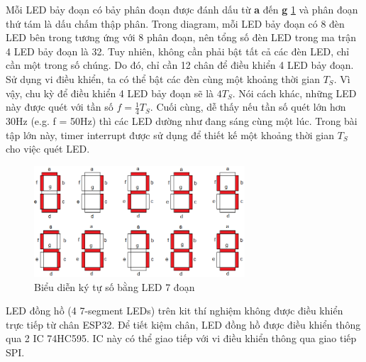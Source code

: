 Mỗi LED bảy đoạn có bảy phân đoạn được đánh dấu từ \textbf{a} đến \textbf{g} \ref{digit} và phân đoạn thứ tám là dấu chấm thập phân. Trong diagram, mỗi LED bảy đoạn có 8 đèn LED bên trong tương ứng với 8 phân đoạn, nên tổng số đèn LED trong ma trận 4 LED bảy đoạn là 32. Tuy nhiên, không cần phải bật tất cả các đèn LED, chỉ cần một trong số chúng. Do đó, chỉ cần 12 chân để điều khiển 4 LED bảy đoạn. Sử dụng vi điều khiển, ta có thể bật các đèn cùng một khoảng thời gian $T_S$. Vì vậy, chu kỳ để  điều khiển 4 LED bảy đoạn sẽ là $4T_S$. Nói cách khác, những LED này được quét với  tần số $f = \frac{1}{4} T_S$. Cuối cùng, dễ thấy nếu tần số quét lớn hơn 30Hz (e.g. f = 50Hz)  thì các LED dường như đang sáng cùng một lúc. Trong bài tập lớn này, timer interrupt được sử dụng để thiết kế một khoảng thời gian $T_S$ cho việc quét LED.
\begin{figure}[h]
    \centering
    \includegraphics[width=0.7\textwidth]{graphics/digit_Led7.png}
    \caption{Biểu diễn ký tự số bằng LED 7 đoạn}
    \label{digit}
\end{figure}

LED đồng hồ (4 7-segment LEDs) trên kit thí nghiệm không được điều khiển trực tiếp từ chân ESP32. Để tiết kiệm chân, LED đồng hồ được điều khiển thông qua 2 IC 74HC595. IC này có thể giao tiếp với vi điều khiển thông qua giao tiếp SPI.


